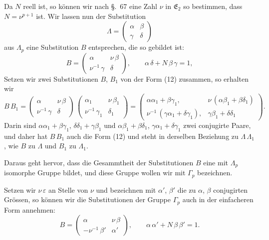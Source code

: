\documentclass[12pt,a4paper]{article}
\begin{document}
Da $N$ reell ist, so können wir nach \S.~67 eine Zahl $\nu$ in $\mathfrak{E}_{2}$ so bestimmen, dass $N = \nu^{p+1}$ ist. Wir lassen nun der Substitution
\[
\varLambda = \begin{pmatrix}\alpha&\beta\\\gamma&\delta\end{pmatrix}
\]
aus $\varLambda_{p}$ eine Substitution $B$ entsprechen, die so gebildet ist:
\begin{equation}\label{eq:69.12}
\tag{12}
B = \begin{pmatrix}\alpha&\nu\,\beta\\\nu^{-1}\,\gamma&\delta\end{pmatrix},\qquad
\alpha\,\delta + N\,\beta\,\gamma = 1,
\end{equation}
Setzen wir zwei Substitutionen $B$, $B_{1}$ von der Form (12) zusammen, so erhalten wir
\[
B\,B_{1} =
\begin{pmatrix}\alpha&\nu\,\beta\\\nu^{-1}\,\gamma&\delta\end{pmatrix}\,
\begin{pmatrix}\alpha_{1}&\nu\,\beta_{1}\\\nu^{-1}\,\gamma_{1}&\delta_{1}\end{pmatrix}
=
\begin{pmatrix}
\alpha\alpha_{1} + \beta\gamma_{1},&
\nu\,(\alpha\beta_{1} + \beta\delta_{1})\\
\nu^{-1}\,(\gamma\alpha_{1} + \delta\gamma_{1}),&
\gamma\beta_{1} + \delta\delta_{1}
\end{pmatrix}.
\]
Darin sind $\alpha\alpha_{1} + \beta\gamma_{1}$, $\delta\delta_{1} + \gamma\beta_{1}$ und $\alpha\beta_{1} + \beta\delta_{1}$, $\gamma\alpha_{1} + \delta\gamma_{1}$ zwei conjugirte Paare, und daher hat $B\,B_{1}$ auch die Form (12) und steht in derselben Beziehung zu $\varLambda\,\varLambda_{1}$, wie $B$ zu $\varLambda$ und $B_{1}$ zu $\varLambda_{1}$.

Daraus geht hervor, dass die Gesammtheit der Substitutionen $B$ eine mit $\varLambda_{p}$ isomorphe Gruppe bildet, und diese Gruppe wollen wir mit $\varGamma_{p}$ bezeichnen.

Setzen wir $\nu\,\varepsilon$ an Stelle von $\nu$ und bezeichnen mit $\alpha'$, $\beta'$ die zu $\alpha$, $\beta$ conjugirten Grössen, so können wir die Substitutionen der Gruppe $\varGamma_{p}$ auch in der einfacheren Form annehmen:
\begin{equation}\label{eq:69.13}
\tag{13}
B = \begin{pmatrix}\alpha&\nu\,\beta\\-\nu^{-1}\,\beta'&\alpha'\end{pmatrix},\qquad
\alpha\,\alpha' + N\,\beta\,\beta' = 1.
\end{equation}
\end{document}
